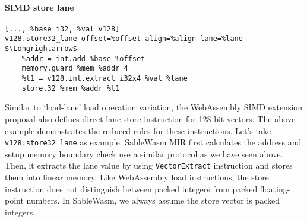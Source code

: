 \paragraph{SIMD store lane} \quad
\begin{lstlisting}[basicstyle=\linespread{1}\small\ttfamily, language=SableWasmMIR, mathescape=true]
[..., %base i32, %val v128]
v128.store32_lane offset=%offset align=%align lane=%lane $\Longrightarrow$
    %addr = int.add %base %offset
    memory.guard %mem %addr 4
    %t1 = v128.int.extract i32x4 %val %lane
    store.32 %mem %addr %t1
\end{lstlisting}
Similar to `load-lane' load operation variation, the WebAssembly SIMD extension proposal also defines direct lane store instruction for 128-bit vectors. The above example demonstrates the reduced rules for these instructions. Let's take \texttt{v128.store32\_lane} as example. SableWasm MIR first calculates the address and setup memory boundary check use a similar protocol as we have seen above. Then, it extracts the lane value by using \texttt{VectorExtract} instruction and stores them into linear memory. Like WebAssembly load instructions, the store instruction does not distinguish between packed integers from packed floating-point numbers. In SableWasm, we always assume the store vector is packed integers.
